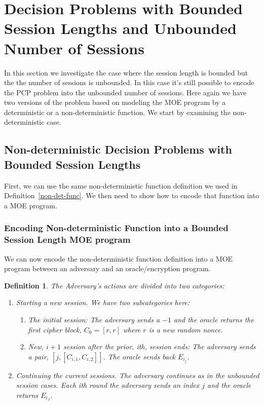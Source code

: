 \documentclass{easychair}
\newtheorem{definition}{Definition}
\begin{document}
\section{Decision Problems with 
Bounded Session Lengths and Unbounded Number of Sessions}

In this section we investigate the case where the session length
is bounded but the the number of sessions is unbounded. In this
case it's still possible to encode the PCP problem into the 
unbounded number of sessions. Here again we have two 
versions of the problem based on modeling the MOE 
program by a deterministic or a non-deterministic function.
We start by examining the non-deterministic case.

\subsection{Non-deterministic Decision Problems with 
	Bounded Session Lengths}

First, we can use the same non-deterministic function 
definition we used in Definition~\ref{non-det-func}.
We then need to show how to encode that function 
into a MOE program. 

\subsubsection{Encoding Non-deterministic Function into a Bounded Session Length MOE program}\label{sec:non-det-bounded-sessions}
We can now encode the non-deterministic function 
definition into a MOE program between an 
adversary and an oracle/encryption program. 

\begin{definition}\label{bounded-non-det-encoding}
The Adversary's actions are divided into two categories:
\begin{enumerate}
	\item Starting a new session.
	We have two subcategories here:
	\begin{enumerate}
		\item The initial session: The adversary sends a 
		$-1$ and the oracle returns the first cipher block,
		$C_0 = [r,r]$ where $r$ is a new random nonce. 
		\item New, $i+1$ session after the prior, ith, session ends: 
		The adversary sends a pair, $[j, [C_{i,1}, C_{i,2}]]$. The oracle sends back $E_{i_j}$. 
	\end{enumerate}
	\item Continuing the current sessions.
	The adversary continues as in the unbounded session 
	cases. Each ith round the adversary sends an index $j$ and
	the oracle returns $E_{i_J}$.
\end{enumerate}
\end{definition}
\end{document}
